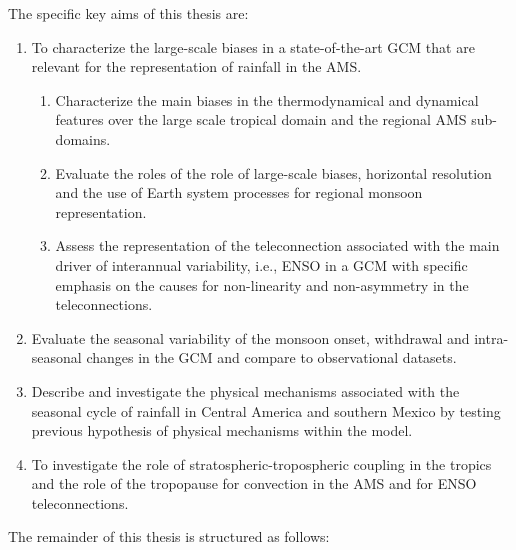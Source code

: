 The specific key aims of this thesis are: 

\begin{enumerate}
\item To characterize the large-scale biases in a state-of-the-art GCM that are relevant for the representation of rainfall in the AMS.  
\begin{enumerate}
\item Characterize the main biases in the thermodynamical and dynamical features over the large scale tropical domain and the regional AMS sub-domains.
\item Evaluate the roles of the role of large-scale biases, horizontal resolution and the use of Earth system processes for regional monsoon representation.
\item Assess the representation of the teleconnection associated with the main driver of interannual variability, i.e., ENSO in a GCM with specific emphasis on the causes for non-linearity and non-asymmetry in the teleconnections.
\end{enumerate}
\item Evaluate the seasonal variability of the monsoon onset, withdrawal and intra-seasonal changes in the GCM and compare to observational datasets. 
\item Describe and investigate the physical mechanisms associated with the seasonal cycle of rainfall in Central America and southern Mexico by testing previous hypothesis of physical mechanisms within the model.
\item To investigate the role of stratospheric-tropospheric coupling in the tropics and the role of the tropopause for convection in the AMS and for ENSO teleconnections.
\end{enumerate}

The remainder of this thesis is structured as follows:

